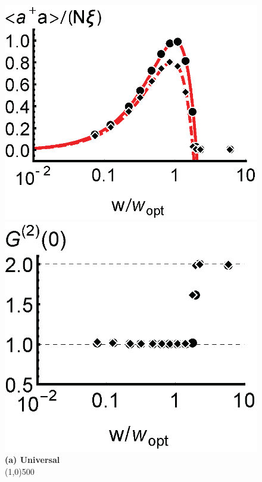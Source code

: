 \documentclass[aps,
twocolumn,
showpacs,
superscriptaddress,groupedaddress]{revtex4}
\begin{document}
\begin{figure}
\begin{center}
	\hspace{-6.5mm} \includegraphics[scale =0.445] {N10000ada.eps}
	\hspace{-5.5mm} \includegraphics[scale =0.445] {N10000G2S.eps}\\
	\textbf{(a) Universal}\\
	\line(1,0){500}\\

\end{center}
\end{figure}
\end{document}
